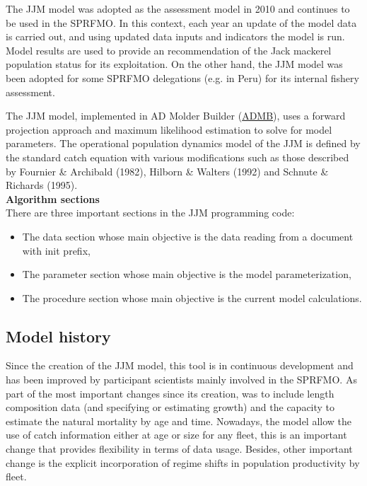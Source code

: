 \documentclass{article}
\begin{document}
The JJM model was adopted as the assessment model in 2010 and continues to be used in the SPRFMO. In this context, each year an update of the model data is carried out, and using updated data inputs and indicators the model is run. Model results are used to provide an recommendation of the Jack mackerel population status for its exploitation. On the other hand, the JJM model was been adopted for some SPRFMO delegations (e.g. in Peru) for its internal fishery assessment.

The JJM model, implemented in AD Molder Builder (\href{https://www.admb-project.org/}{ADMB}), uses a forward projection approach and maximum likelihood estimation to solve for model parameters. The operational population dynamics model of the JJM is defined by the standard catch equation with various modifications such as those described by Fournier \& Archibald (1982), Hilborn \& Walters (1992) and Schnute \& Richards (1995).\\

\textbf{Algorithm sections}\\

There are three important sections in the JJM programming code:

\begin{itemize}
    \item The data section whose main objective is the data reading from a document with init prefix,
    \item The parameter section whose main objective is the model parameterization,
    \item The procedure section whose main objective is the current model calculations.
\end{itemize}

\subsection{Model history}
Since the creation of the JJM model, this tool is in continuous development and has been improved by participant scientists mainly involved in the SPRFMO. As part of the most important changes since its creation, was to include length composition data (and specifying or estimating growth) and the capacity to estimate the natural mortality by age and time. Nowadays, the model allow the use of catch information either at age or size for any fleet, this is an important change that provides flexibility in terms of data usage. Besides, other important change is the explicit incorporation of regime shifts in population productivity by fleet.
\end{document}
